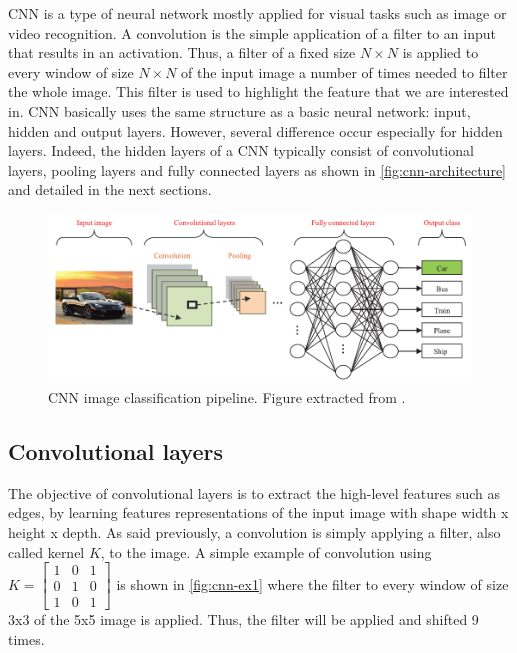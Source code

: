 \documentclass[11pt, openany]{report}
\theoremstyle{plain}
\theoremstyle{definition}
\theoremstyle{remark}
\begin{document}
CNN is a type of neural network mostly applied for visual tasks such as image or video recognition.  A convolution is the simple application of a filter to an input that results in an activation. Thus, a filter of a fixed size $N \times N$ is applied to every window of size $N \times N$ of the input image a number of times needed to filter the whole image. This filter is used to highlight the feature that we are interested in. CNN basically uses the same structure as a basic neural network: input, hidden and output layers. However, several difference occur especially for hidden layers. Indeed, the hidden layers of a CNN typically consist of convolutional layers, pooling layers and fully connected layers as shown in \autoref{fig:cnn-architecture} and detailed in the next sections. 

\begin{figure}[h]
  \centering
  \includegraphics[scale=0.55]{figures/cnn-architecture.png}
  \caption{CNN image classification pipeline. Figure extracted from \cite{CNN-1}.}
  \label{fig:cnn-architecture}
\end{figure}

\subsection{Convolutional layers} \label{sec:conv-layers}
The objective of convolutional layers is to extract the high-level features such as edges, by learning features representations of the input image with shape width x height x depth.  As said previously, a convolution is simply applying a filter, also called kernel $K$, to the image. A simple example of convolution using $K = \begin{bmatrix} 
1 & 0 & 1 \\
0 & 1 & 0 \\
1 & 0 & 1 
\end{bmatrix}$ 
is shown in \autoref{fig:cnn-ex1} where the filter to every window of size 3x3 of the 5x5 image is applied. Thus, the filter will be applied and shifted 9 times. 
\end{document}
